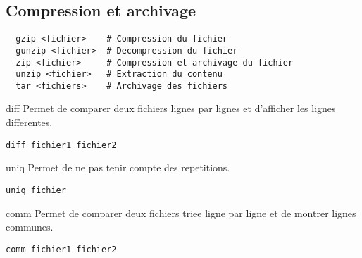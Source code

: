 \documentclass{article}
\begin{document}
\subsection{Compression et archivage}
\begin{lstlisting}
  gzip <fichier>    # Compression du fichier
  gunzip <fichier>  # Decompression du fichier
  zip <fichier>     # Compression et archivage du fichier
  unzip <fichier>   # Extraction du contenu
  tar <fichiers>    # Archivage des fichiers
\end{lstlisting}

diff
Permet de comparer deux fichiers lignes par lignes et d'afficher les lignes differentes.
\begin{lstlisting}
diff fichier1 fichier2
\end{lstlisting}

uniq
Permet de ne pas tenir compte des repetitions.
\begin{lstlisting}
uniq fichier
\end{lstlisting}

comm
Permet de comparer deux fichiers triee ligne par ligne et de montrer lignes communes.
\begin{lstlisting}
comm fichier1 fichier2
\end{lstlisting}
\end{document}
